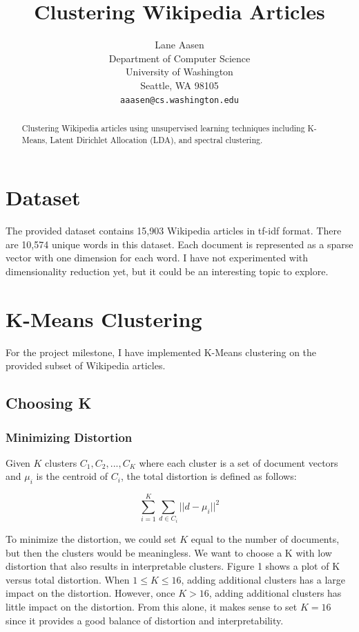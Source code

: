 \documentclass{article} %
\title{Clustering Wikipedia Articles}
\author{
Lane Aasen\\
Department of Computer Science\\
University of Washington\\
Seattle, WA 98105\\
\texttt{aaasen@cs.washington.edu}\\
}
\begin{document}
\maketitle

\begin{abstract}
Clustering Wikipedia articles using unsupervised learning techniques including K-Means, Latent Dirichlet Allocation (LDA), and spectral clustering.
\end{abstract}


\section{Dataset}

The provided dataset contains 15,903 Wikipedia articles in tf-idf format. There are 10,574 unique words in this dataset. Each document is represented as a sparse vector with one dimension for each word. I have not experimented with dimensionality reduction yet, but it could be an interesting topic to explore.

\section{K-Means Clustering}

For the project milestone, I have implemented K-Means clustering on the provided subset of Wikipedia articles.

\subsection{Choosing K}

\subsubsection{Minimizing Distortion}

Given $K$ clusters $C_{1},C_{2},...,C_{K}$ where each cluster is a set of document vectors and $\mu_{i}$ is the centroid of $C_{i}$, the total distortion is defined as follows:

$$\sum_{i=1}^{K}\sum_{d \in C_{i}} ||d - \mu_{i}||^{2}$$

To minimize the distortion, we could set $K$ equal to the number of documents, but then the clusters would be meaningless. We want to choose a K with low distortion that also results in interpretable clusters. Figure 1 shows a plot of K versus total distortion. When $1 \leq K \leq 16$, adding additional clusters has a large impact on the distortion. However, once $K > 16$, adding additional clusters has little impact on the distortion. From this alone, it makes sense to set $K=16$ since it provides a good balance of distortion and interpretability.
\end{document}
